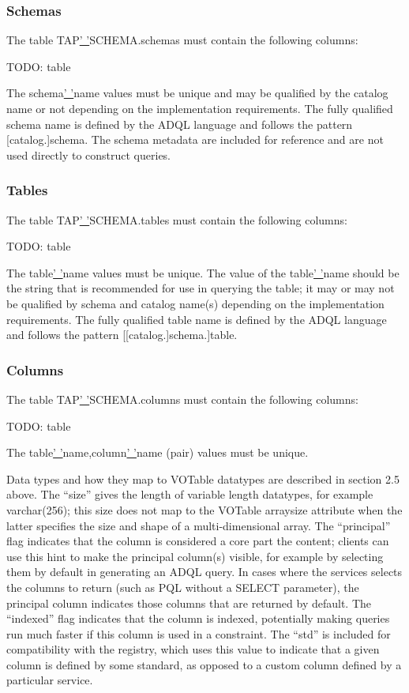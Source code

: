 \documentclass[11pt,a4paper]{ivoa}
\begin{document}
\subsubsection{Schemas}
The table TAP\underline{' '}SCHEMA.schemas must contain the following columns:

TODO: table

The schema\underline{' '}name values must be unique and may be qualified by the 
catalog name or not depending on the implementation requirements. The fully 
qualified schema name is defined by the ADQL language and  follows the pattern 
[catalog.]schema. The schema metadata are included for reference and are not 
used directly to construct queries.

\subsubsection{Tables}
The table TAP\underline{' '}SCHEMA.tables must contain the following columns:

TODO: table

The table\underline{' '}name values must be unique. The value of the 
table\underline{' '}name should be the string that is recommended for use in 
querying the table; it may or may not be qualified by schema and catalog name(s) 
depending on the implementation requirements. The fully qualified table name is 
defined by the ADQL language and follows the pattern [[catalog.]schema.]table. 

\subsubsection{Columns}
The table TAP\underline{' '}SCHEMA.columns must contain the following columns:

TODO: table

The table\underline{' '}name,column\underline{' '}name (pair) values must be 
unique.

Data types and how they map to VOTable datatypes are described in section 2.5 
above. The “size” gives the length of variable length datatypes, for example 
varchar(256); this size does not map to the VOTable arraysize attribute when the 
latter specifies the size and shape of a multi-dimensional array. The 
“principal” flag indicates that the column is considered a core part the 
content; clients can use this hint to make the principal column(s) visible, for 
example by selecting them by default in generating an ADQL query. In cases where 
the services selects the columns to return (such as PQL without a SELECT 
parameter), the principal column indicates those columns that are returned by 
default. The “indexed” flag indicates that the column is indexed, potentially 
making queries run much faster if this column is used in a constraint. The “std” 
is included for compatibility with the registry, which uses this value to 
indicate that a given column is defined by some standard, as opposed to a custom 
column defined by a particular service.
\end{document}
